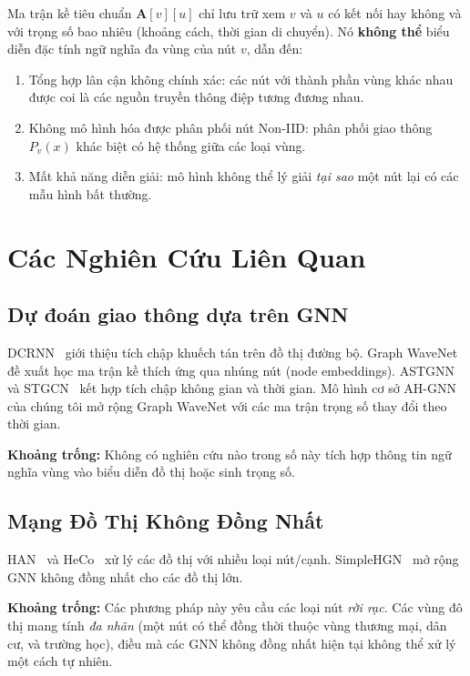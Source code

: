 \documentclass[12pt,a4paper]{article}
\begin{document}
Ma trận kề tiêu chuẩn $\mathbf{A}[v][u]$ chỉ lưu trữ xem $v$ và $u$
có kết nối hay không và với trọng số bao nhiêu (khoảng cách, thời gian di chuyển). Nó \textbf{không thể}
biểu diễn đặc tính ngữ nghĩa đa vùng của nút $v$, dẫn đến:

\begin{enumerate}
    \item Tổng hợp lân cận không chính xác: các nút với thành phần vùng khác nhau
          được coi là các nguồn truyền thông điệp tương đương nhau.
    \item Không mô hình hóa được phân phối nút Non-IID: phân phối giao thông
          $P_v(x)$ khác biệt có hệ thống giữa các loại vùng.
    \item Mất khả năng diễn giải: mô hình không thể lý giải \textit{tại sao}
          một nút lại có các mẫu hình bất thường.
\end{enumerate}

\section{Các Nghiên Cứu Liên Quan}

\subsection{Dự đoán giao thông dựa trên GNN}
DCRNN~\cite{li2018diffusion} giới thiệu tích chập khuếch tán trên đồ thị đường bộ.
Graph WaveNet~\cite{wu2019graph} đề xuất học ma trận kề thích ứng qua
nhúng nút (node embeddings). ASTGNN~\cite{guo2021learning} và STGCN~\cite{yu2018spatio}
kết hợp tích chập không gian và thời gian. Mô hình cơ sở AH-GNN của chúng tôi mở rộng
Graph WaveNet với các ma trận trọng số thay đổi theo thời gian.

\textbf{Khoảng trống:} Không có nghiên cứu nào trong số này tích hợp thông tin ngữ nghĩa vùng vào
biểu diễn đồ thị hoặc sinh trọng số.

\subsection{Mạng Đồ Thị Không Đồng Nhất}
HAN~\cite{wang2019heterogeneous} và HeCo~\cite{wang2021self} xử lý các đồ thị với
nhiều loại nút/cạnh. SimpleHGN~\cite{lv2021we} mở rộng GNN không đồng nhất cho
các đồ thị lớn.

\textbf{Khoảng trống:} Các phương pháp này yêu cầu các loại nút \textit{rời rạc}. Các vùng đô thị mang tính
\textit{đa nhãn} (một nút có thể đồng thời thuộc vùng thương mại, dân cư,
và trường học), điều mà các GNN không đồng nhất hiện tại không thể xử lý một cách tự nhiên.
\end{document}
